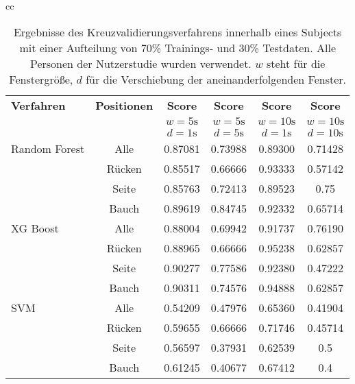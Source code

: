 \begin{table}
  \begin{tabular}{cc}
    \begin{minipage}{1\textwidth}
      \begin{center}
          \begin{tabular}{ | l | c | c | c | c | c | }
            \hline
            \textbf{Verfahren} & \textbf{Positionen} & \textbf{Score} & \textbf{Score} & \textbf{Score} & \textbf{Score} \\ 
            & & \textbf{$w=5\si{\s}$} & \textbf{$w=5\si{\s}$} & \textbf{$w=10\si{\s}$} & \textbf{$w=10\si{\s}$} \\
            & & \textbf{$d=1\si{\s}$} & \textbf{$d=5\si{\s}$} & \textbf{$d=1\si{\s}$} & \textbf{$d=10\si{\s}$} \\ \hline
            Random Forest & Alle &  0.87081 & 0.73988 & 0.89300 & 0.71428 \\ 
             & Rücken & 0.85517 & 0.66666 & 0.93333 & 0.57142 \\
             & Seite  & 0.85763 & 0.72413 & 0.89523 & 0.75 \\
             & Bauch  & 0.89619 & 0.84745 & 0.92332 & 0.65714 \\ \hline
            XG Boost  & Alle & 0.88004 & 0.69942 & 0.91737 & 0.76190 \\ 
             & Rücken & 0.88965 & 0.66666 & 0.95238 & 0.62857 \\
             & Seite  & 0.90277 & 0.77586 & 0.92380 & 0.47222 \\
             & Bauch  & 0.90311 & 0.74576 & 0.94888 & 0.62857 \\ \hline
            SVM & Alle& 0.54209 & 0.47976 & 0.65360 & 0.41904 \\ 
             & Rücken & 0.59655 & 0.66666 & 0.71746 & 0.45714 \\
             & Seite  & 0.56597 & 0.37931 & 0.62539 & 0.5 \\
             & Bauch  & 0.61245 & 0.40677 & 0.67412 & 0.4 \\
            \hline
          \end{tabular}
      \end{center}
    \end{minipage}
  \end{tabular}
  \caption{Ergebnisse des Kreuzvalidierungsverfahrens innerhalb eines Subjects mit einer Aufteilung von 70\% Trainings- und 30\% Testdaten. Alle Personen der Nutzerstudie wurden verwendet. $w$ steht für die Fenstergröße, $d$ für die Verschiebung der aneinanderfolgenden Fenster.}
  \label{evaluation:within_subject_results}
\end{table}

